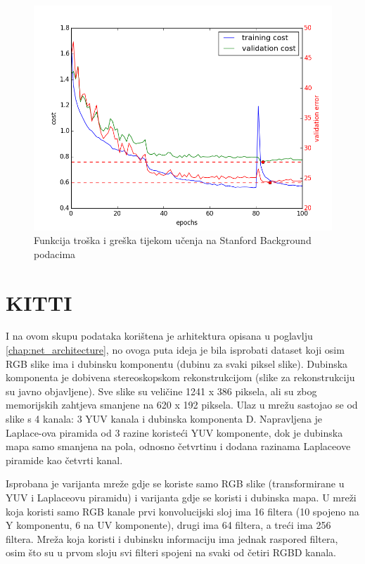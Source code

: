 \documentclass[times, utf8, diplomski, numeric]{fer}
\begin{document}
\begin{figure}[htb]
  \centering
  \includegraphics[width=\textwidth]{imgs/cost-iccv.png}
  \caption{Funkcija troška i greška tijekom učenja na Stanford Background podacima}
  \label{fig:iccv_train}
\end{figure}

\section{KITTI}

I na ovom skupu podataka korištena je arhitektura opisana u poglavlju \ref{chap:net_architecture}, no ovoga puta ideja je bila isprobati dataset koji osim RGB slike ima i dubinsku komponentu (dubinu za svaki piksel slike). Dubinska komponenta je dobivena stereoskopskom rekonstrukcijom (slike za rekonstrukciju su javno objavljene). Sve slike su veličine 1241 x 386 piksela, ali su zbog memorijskih zahtjeva smanjene na 620 x 192 piksela. Ulaz u mrežu sastojao se od slike s 4 kanala: 3 YUV kanala i dubinska komponenta D. Napravljena je Laplace-ova piramida od 3 razine koristeći YUV komponente, dok je dubinska mapa samo smanjena na pola, odnosno četvrtinu i dodana razinama Laplaceove piramide kao četvrti kanal.

Isprobana je varijanta mreže gdje se koriste samo RGB slike (transformirane u YUV i Laplaceovu piramidu) i varijanta gdje se koristi i dubinska mapa. U mreži koja koristi samo RGB kanale prvi konvolucijski sloj ima 16 filtera (10 spojeno na Y komponentu, 6 na UV komponente), drugi ima 64 filtera, a treći ima 256 filtera.
Mreža koja koristi i dubinsku informaciju ima jednak raspored filtera, osim što su u prvom sloju svi filteri spojeni na svaki od četiri RGBD kanala.
\end{document}
